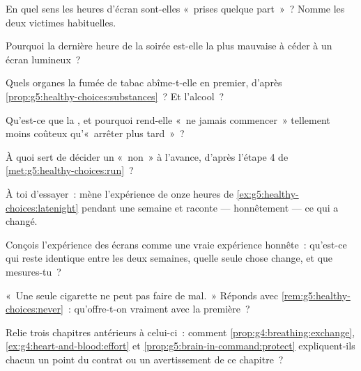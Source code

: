 \begin{exercise}[$\star$]\label{exo:g5:healthy-choices:3}
En quel sens les heures d'écran sont-elles «~prises quelque part~»~?
Nomme les deux victimes habituelles.
\end{exercise}

\begin{exercise}[$\star$]\label{exo:g5:healthy-choices:4}
Pourquoi la dernière heure de la soirée est-elle la plus mauvaise à
céder à un écran lumineux~?
\end{exercise}

\begin{exercise}[$\star$]\label{exo:g5:healthy-choices:5}
Quels organes la fumée de tabac abîme-t-elle en premier, d'après
\cref{prop:g5:healthy-choices:substances}~? Et l'alcool~?
\end{exercise}

\begin{exercise}[$\star$]\label{exo:g5:healthy-choices:6}
Qu'est-ce que la , et pourquoi rend-elle «~ne jamais
commencer~» tellement moins coûteux qu'«~arrêter plus tard~»~?
\end{exercise}

\begin{exercise}[$\star$]\label{exo:g5:healthy-choices:7}
À quoi sert de décider un «~non~» à l'avance, d'après l'étape 4 de
\cref{met:g5:healthy-choices:run}~?
\end{exercise}

\begin{exercise}[$\star$]\label{exo:g5:healthy-choices:8}
À toi d'essayer~: mène l'expérience de onze heures de
\cref{ex:g5:healthy-choices:latenight} pendant une semaine et
raconte --- honnêtement --- ce qui a changé.
\end{exercise}

\begin{exercise}[$\star\star$]\label{exo:g5:healthy-choices:9}
Conçois l'expérience des écrans comme une vraie expérience
honnête~: qu'est-ce qui reste identique entre les deux semaines,
quelle seule chose change, et que mesures-tu~?
\end{exercise}

\begin{exercise}[$\star\star$]\label{exo:g5:healthy-choices:10}
«~Une seule cigarette ne peut pas faire de mal.~» Réponds avec
\cref{rem:g5:healthy-choices:never}~: qu'offre-t-on vraiment avec la
première~?
\end{exercise}

\begin{exercise}[$\star\star\star$]\label{exo:g5:healthy-choices:11}
Relie trois chapitres antérieurs à celui-ci~: comment
\cref{prop:g4:breathing:exchange},
\cref{ex:g4:heart-and-blood:effort} et
\cref{prop:g5:brain-in-command:protect} expliquent-ils chacun un
point du contrat ou un avertissement de ce chapitre~?
\end{exercise}
